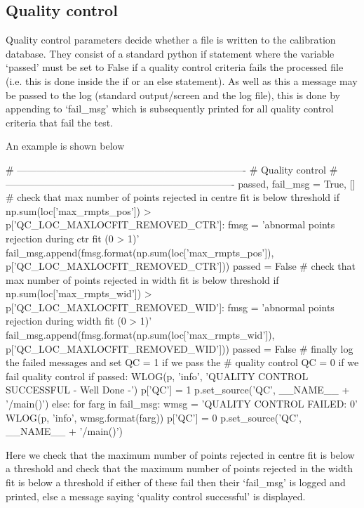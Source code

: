 \clearpage
\newpage
\subsection{Quality control}
\label{ch:the_recipes:gen_layout:gen_qc}

Quality control parameters decide whether a file is written to the calibration database. They consist of a standard python if statement where the variable `passed' must be set to False if a quality control criteria fails the processed file (i.e. this is done inside the if or an else statement). As well as this a message may be passed to the log (standard output/screen and the log file), this is done by appending to `fail\_msg' which is subsequently printed for all quality control criteria that fail the test.

\vspace{0.5cm}
\begin{minipage}{\textwidth}
\noindent An example is shown below
\begin{pythonbox}
# ----------------------------------------------------------------------
# Quality control
# ----------------------------------------------------------------------
passed, fail_msg = True, []
# check that max number of points rejected in centre fit is below threshold
if np.sum(loc['max_rmpts_pos']) > p['QC_LOC_MAXLOCFIT_REMOVED_CTR']:
    fmsg = 'abnormal points rejection during ctr fit ({0} > {1})'
    fail_msg.append(fmsg.format(np.sum(loc['max_rmpts_pos']),
                                p['QC_LOC_MAXLOCFIT_REMOVED_CTR']))
    passed = False
# check that max number of points rejected in width fit is below threshold
if np.sum(loc['max_rmpts_wid']) > p['QC_LOC_MAXLOCFIT_REMOVED_WID']:
    fmsg = 'abnormal points rejection during width fit ({0} > {1})'
    fail_msg.append(fmsg.format(np.sum(loc['max_rmpts_wid']),
                                p['QC_LOC_MAXLOCFIT_REMOVED_WID']))
    passed = False
# finally log the failed messages and set QC = 1 if we pass the
# quality control QC = 0 if we fail quality control
if passed:
    WLOG(p, 'info', 'QUALITY CONTROL SUCCESSFUL - Well Done -')
    p['QC'] = 1
    p.set_source('QC', __NAME__ + '/main()')
else:
    for farg in fail_msg:
        wmsg = 'QUALITY CONTROL FAILED: {0}'
        WLOG(p, 'info', wmsg.format(farg))
    p['QC'] = 0
    p.set_source('QC', __NAME__ + '/main()')
\end{pythonbox}
\begin{note}
Here we check that the maximum number of points rejected in centre fit is below a threshold and check that the maximum number of points rejected in the width fit is below a threshold if either of these fail then their `fail\_msg' is logged and printed, else a message saying `quality control successful' is displayed.
\end{note}
\end{minipage}


